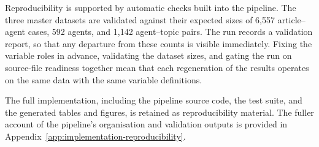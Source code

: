 Reproducibility is supported by automatic checks built into the pipeline. The three master datasets are validated against their expected sizes of 6,557 article–agent cases, 592 agents, and 1,142 agent–topic pairs. The run records a validation report, so that any departure from these counts is visible immediately. Fixing the variable roles in advance, validating the dataset sizes, and gating the run on source-file readiness together mean that each regeneration of the results operates on the same data with the same variable definitions.

The full implementation, including the pipeline source code, the test suite, and the generated tables and figures, is retained as reproducibility material. The fuller account of the pipeline's organisation and validation outputs is provided in Appendix~\ref{app:implementation-reproducibility}.
